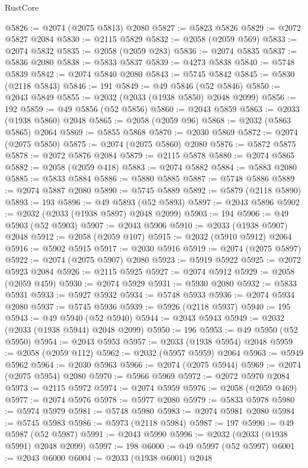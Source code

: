 \begin{lexlean}{RustCore}
\begin{coremodule}
@5826 := @2074 (@2075 @5813) @2080
@5827 := @5823 @5826
@5829 := @2072 @5827 @2084
@5830 := @2115 @5829
@5832 := @2058 (@2059 @569)
@5833 := @2074 @5832
@5835 := @2058 (@2059 @283)
@5836 := @2074 @5835
@5837 := @5836 @2080
@5838 := @5833 @5837
@5839 := @4273 @5838
@5840 := @5748 @5839
@5842 := @2074 @5840 @2080
@5843 := @5745 @5842
@5845 := @5830 (@2118 @5843)
@5846 := 191
@5849 := @49 @5846 (@52 @5846)
@5850 := @2043 @5849
@5855 := @2032 (@2033 (@1938 @5850) @2048 @2099)
@5856 := 192
@5859 := @49 @5856 (@52 @5856)
@5860 := @2043 @5859
@5863 := @2033 (@1938 @5860) @2048
@5865 := @2058 (@2059 @96)
@5868 := @2032 (@5863 @5865) @2064
@5869 := @5855 @5868
@5870 := @2030 @5869
@5872 := @2074 (@2075 @5850)
@5875 := @2074 (@2075 @5860) @2080
@5876 := @5872 @5875
@5878 := @2072 @5876 @2084
@5879 := @2115 @5878
@5880 := @2074 @5865
@5882 := @2058 (@2059 @418)
@5883 := @2074 @5882
@5884 := @5883 @2080
@5885 := @5833 @5884
@5886 := @5880 @5885
@5887 := @5748 @5886
@5889 := @2074 @5887 @2080
@5890 := @5745 @5889
@5892 := @5879 (@2118 @5890)
@5893 := 193
@5896 := @49 @5893 (@52 @5893)
@5897 := @2043 @5896
@5902 := @2032 (@2033 (@1938 @5897) @2048 @2099)
@5903 := 194
@5906 := @49 @5903 (@52 @5903)
@5907 := @2043 @5906
@5910 := @2033 (@1938 @5907) @2048
@5912 := @2058 (@2059 @107)
@5915 := @2032 (@5910 @5912) @2064
@5916 := @5902 @5915
@5917 := @2030 @5916
@5919 := @2074 (@2075 @5897)
@5922 := @2074 (@2075 @5907) @2080
@5923 := @5919 @5922
@5925 := @2072 @5923 @2084
@5926 := @2115 @5925
@5927 := @2074 @5912
@5929 := @2058 (@2059 @459)
@5930 := @2074 @5929
@5931 := @5930 @2080
@5932 := @5833 @5931
@5933 := @5927 @5932
@5934 := @5748 @5933
@5936 := @2074 @5934 @2080
@5937 := @5745 @5936
@5939 := @5926 (@2118 @5937)
@5940 := 195
@5943 := @49 @5940 (@52 @5940)
@5944 := @2043 @5943
@5949 := @2032 (@2033 (@1938 @5944) @2048 @2099)
@5950 := 196
@5953 := @49 @5950 (@52 @5950)
@5954 := @2043 @5953
@5957 := @2033 (@1938 @5954) @2048
@5959 := @2058 (@2059 @112)
@5962 := @2032 (@5957 @5959) @2064
@5963 := @5949 @5962
@5964 := @2030 @5963
@5966 := @2074 (@2075 @5944)
@5969 := @2074 (@2075 @5954) @2080
@5970 := @5966 @5969
@5972 := @2072 @5970 @2084
@5973 := @2115 @5972
@5974 := @2074 @5959
@5976 := @2058 (@2059 @469)
@5977 := @2074 @5976
@5978 := @5977 @2080
@5979 := @5833 @5978
@5980 := @5974 @5979
@5981 := @5748 @5980
@5983 := @2074 @5981 @2080
@5984 := @5745 @5983
@5986 := @5973 (@2118 @5984)
@5987 := 197
@5990 := @49 @5987 (@52 @5987)
@5991 := @2043 @5990
@5996 := @2032 (@2033 (@1938 @5991) @2048 @2099)
@5997 := 198
@6000 := @49 @5997 (@52 @5997)
@6001 := @2043 @6000
@6004 := @2033 (@1938 @6001) @2048

\end{coremodule}
\end{lexlean}
